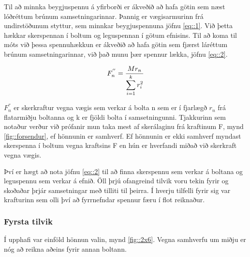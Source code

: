 Til að minnka beygjuspennu á yfirborði er ákveðið að hafa götin sem næst lóðréttum brúnum samsetningarinnar.
Þannig er vægisarmurinn frá undirstöðunum styttur, sem minnkar beygjuspennuna \sbr jöfnu \ref{eq::1}. 
Við þetta hækkar skerspennan í boltum og leguspennan í götum efnisins. 
Til að koma til móts við þessa spennuhækkun er ákveðið að hafa götin sem fjærst láréttum brúnum samsetningarinnar, við það munu þær spennur lækka, \sbr jöfnu \ref{eq::2}\cite{shigleys}.

\begin{equation}
  F_n^{''} = {
    M r_n 
    \over 
    \displaystyle\sum_{i=1}^{k} r_i^2
  }
  \label{eq::2}
\end{equation}

$F_n^{''}$ er skerkraftur vegna vægis sem verkar á bolta n sem er í fjarlægð $r_n$ frá flatarmiðju boltanna og k er fjöldi bolta í samsetningunni. Tjakkurinn sem notaður verður við prófanir mun taka mest af skerálaginu frá kraftinum F, \sbr mynd \ref{fig::forsendur}, ef hönnunin er samhverf. Ef hönnunin er ekki samhverf myndast skerspenna í boltum vegna kraftsins F en hún er hverfandi miðað við skerkraft vegna vægis.


Því er hægt að nota jöfnu \ref{eq::2} til að finna skerspennu sem verkar á boltana og leguspennu sem verkar á efnið. 
Öll þrjú ofangreind tilvik voru tekin fyrir og skoðaðar þrjár samsetningar með tilliti til þeirra.
Í hverju tilfelli fyrir sig var krafturinn sem olli því að fyrrnefndar spennur færu í flot reiknaður.

\subsubsection{Fyrsta tilvik}

Í upphafi var einföld hönnun valin, \sbr mynd \ref{fig::2x6}. Vegna samhverfu um miðju er nóg að reikna aðeins fyrir annan boltann.

